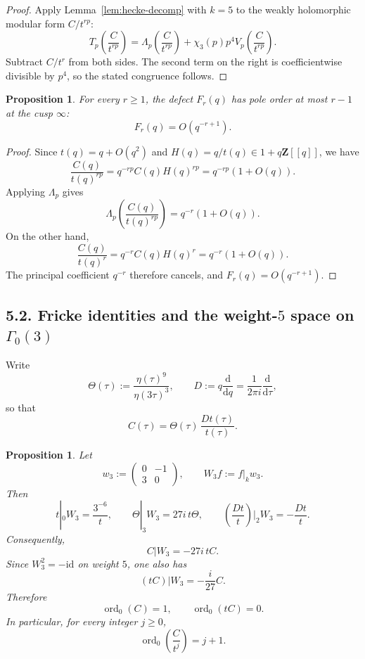 \documentclass[11pt]{amsart}
\newtheorem{proposition}[theorem]{Proposition}
\theoremstyle{remark}
\DeclareMathOperator{\ord}{ord}
\newcommand{\Z}{\mathbf{Z}}
\newcommand{\dd}{\mathrm{d}}
\begin{document}
\begin{proof}
Apply Lemma~\ref{lem:hecke-decomp} with $k=5$ to the weakly holomorphic modular form $C/t^{rp}$:
\[
T_p\!\left(\frac{C}{t^{rp}}\right)
=
\Lambda_p\!\left(\frac{C}{t^{rp}}\right)+\chi_3(p)p^4V_p\!\left(\frac{C}{t^{rp}}\right).
\]
Subtract $C/t^r$ from both sides. The second term on the right is coefficientwise divisible by $p^4$, so the stated congruence follows.
\end{proof}

\begin{proposition}\label{prop:defect-pole-order}
For every $r\ge1$, the defect $F_r(q)$ has pole order at most $r-1$ at the cusp $\infty$:
\[
F_r(q)=O(q^{-r+1}).
\]
\end{proposition}

\begin{proof}
Since $t(q)=q+O(q^2)$ and $H(q)=q/t(q)\in1+q\Z[[q]]$, we have
\[
\frac{C(q)}{t(q)^{rp}}=q^{-rp}C(q)H(q)^{rp}=q^{-rp}(1+O(q)).
\]
Applying $\Lambda_p$ gives
\[
\Lambda_p\!\left(\frac{C(q)}{t(q)^{rp}}\right)=q^{-r}(1+O(q)).
\]
On the other hand,
\[
\frac{C(q)}{t(q)^r}=q^{-r}C(q)H(q)^r=q^{-r}(1+O(q)).
\]
The principal coefficient $q^{-r}$ therefore cancels, and $F_r(q)=O(q^{-r+1})$.
\end{proof}

\subsection*{5.2. Fricke identities and the weight-$5$ space on $\Gamma_0(3)$}

Write
\[
\Theta(\tau):=\frac{\eta(\tau)^9}{\eta(3\tau)^3},
\qquad
D:=q\frac{\dd}{\dd q}=\frac{1}{2\pi i}\frac{\dd}{\dd\tau},
\]
so that
\[
C(\tau)=\Theta(\tau)\,\frac{Dt(\tau)}{t(\tau)}.
\]

\begin{proposition}\label{prop:fricke-C}
Let
\[
w_3:=\begin{pmatrix}0&-1\\ 3&0\end{pmatrix},
\qquad
W_3f:=f|_k w_3.
\]
Then
\[
t|_0W_3=\frac{3^{-6}}{t},
\qquad
\Theta|_3W_3=27i\,t\Theta,
\qquad
\left(\frac{Dt}{t}\right)\!\Big|_2W_3=-\frac{Dt}{t}.
\]
Consequently,
\[
C|W_3=-27i\,tC.
\]
Since $W_3^2=-\mathrm{id}$ on weight $5$, one also has
\[
(tC)|W_3=-\frac{i}{27}C.
\]
Therefore
\[
\ord_0(C)=1,
\qquad
\ord_0(tC)=0.
\]
In particular, for every integer $j\ge0$,
\[
\ord_0\!\left(\frac{C}{t^j}\right)=j+1.
\]
\end{proposition}
\end{document}
